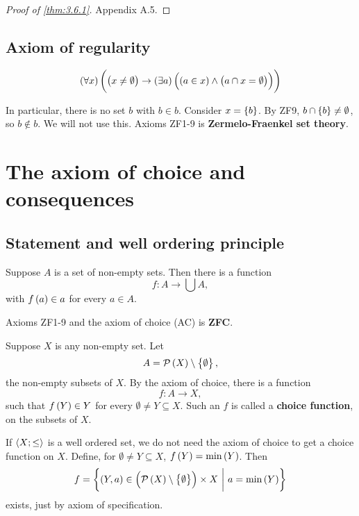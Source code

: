 \begin{proof}[Proof of \ref{thm:3.6.1}]
Appendix A.5.
\end{proof}

\subsection{Axiom of regularity}

\begin{axiom**}
$$ \fab{x}\impb{\br{x \ne \emptyset}}{\teb{a}\andb{\inb{a}{x}}{\eqb{a \cap x}{\emptyset}}} $$
\end{axiom**}

In particular, there is no set $ b $ with $ b \in b $. Consider $ x = \cbr{b} $. By ZF9, $ b \cap \cbr{b} \ne \emptyset $, so $ b \notin b $. We will not use this. Axioms ZF1-9 is \textbf{Zermelo-Fraenkel set theory}.

\pagebreak

\section{The axiom of choice and consequences}

\subsection{Statement and well ordering principle}

\begin{definition}
Suppose $ A $ is a set of non-empty sets. Then there is a function
$$ f : A \to \bigcup A, $$
with $ f\br{a} \in a $ for every $ a \in A $.
\end{definition}

Axioms ZF1-9 and the axiom of choice (AC) is \textbf{ZFC}.

\begin{example}
Suppose $ X $ is any non-empty set. Let
$$ A = \PPP\br{X} \setminus \cbr{\emptyset}, $$
the non-empty subsets of $ X $. By the axiom of choice, there is a function
$$ f : A \to X, $$
such that $ f\br{Y} \in Y $ for every $ \emptyset \ne Y \subseteq X $. Such an $ f $ is called a \textbf{choice function}, on the subsets of $ X $.
\end{example}

\begin{note*}
If $ \left\langle X; \le \right\rangle $ is a well ordered set, we do not need the axiom of choice to get a choice function on $ X $. Define, for $ \emptyset \ne Y \subseteq X $, $ f\br{Y} = \min\br{Y} $. Then
$$ f = \cbr{\br{Y, a} \in \br{\PPP\br{X} \setminus \cbr{\emptyset}} \times X \st a = \min\br{Y}} $$
exists, just by axiom of specification.
\end{note*}

